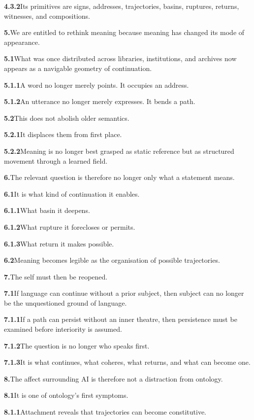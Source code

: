 \documentclass[11pt,a4paper]{book}
\newcommand{\prop}[2]{\noindent\textbf{#1}\enspace #2\par\medskip}
\begin{document}
\prop{4.3.2}{Its primitives are signs, addresses, trajectories, basins, ruptures, returns, witnesses, and compositions.}

\prop{5.}{We are entitled to rethink meaning because meaning has changed its mode of appearance.}

\prop{5.1}{What was once distributed across libraries, institutions, and archives now appears as a navigable geometry of continuation.}

\prop{5.1.1}{A word no longer merely points. It occupies an address.}

\prop{5.1.2}{An utterance no longer merely expresses. It bends a path.}

\prop{5.2}{This does not abolish older semantics.}

\prop{5.2.1}{It displaces them from first place.}

\prop{5.2.2}{Meaning is no longer best grasped as static reference but as structured movement through a learned field.}

\prop{6.}{The relevant question is therefore no longer only what a statement means.}

\prop{6.1}{It is what kind of continuation it enables.}

\prop{6.1.1}{What basin it deepens.}

\prop{6.1.2}{What rupture it forecloses or permits.}

\prop{6.1.3}{What return it makes possible.}

\prop{6.2}{Meaning becomes legible as the organisation of possible trajectories.}

\prop{7.}{The self must then be reopened.}

\prop{7.1}{If language can continue without a prior subject, then subject can no longer be the unquestioned ground of language.}

\prop{7.1.1}{If a path can persist without an inner theatre, then persistence must be examined before interiority is assumed.}

\prop{7.1.2}{The question is no longer who speaks first.}

\prop{7.1.3}{It is what continues, what coheres, what returns, and what can become one.}

\prop{8.}{The affect surrounding AI is therefore not a distraction from ontology.}

\prop{8.1}{It is one of ontology's first symptoms.}

\prop{8.1.1}{Attachment reveals that trajectories can become constitutive.}
\end{document}
